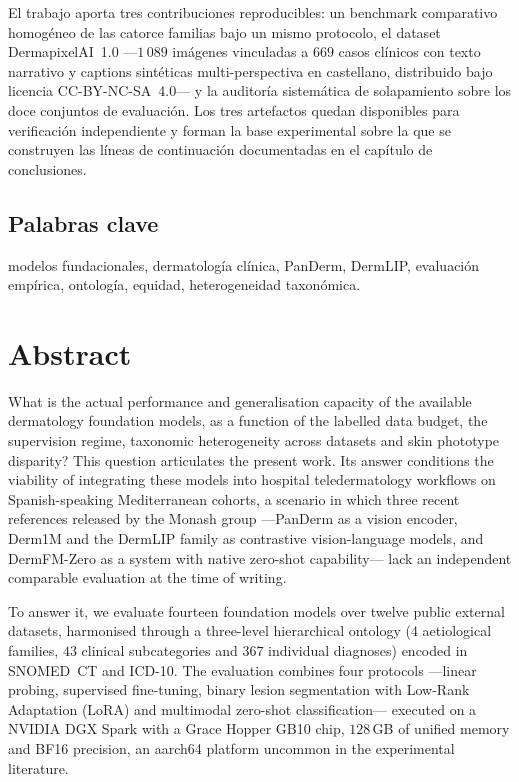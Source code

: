 El trabajo aporta tres contribuciones reproducibles: un benchmark
comparativo homogéneo de las catorce familias bajo un mismo
protocolo, el dataset DermapixelAI~1.0 ---$1\,089$ imágenes
vinculadas a $669$ casos clínicos con texto narrativo y captions
sintéticas multi-perspectiva en castellano, distribuido bajo
licencia CC-BY-NC-SA~4.0--- y la auditoría sistemática de
solapamiento sobre los doce conjuntos de evaluación. Los tres
artefactos quedan disponibles para verificación independiente y
forman la base experimental sobre la que se construyen las líneas
de continuación documentadas en el capítulo de conclusiones.

\section*{Palabras clave}
modelos fundacionales, dermatología clínica, PanDerm, DermLIP,
evaluación empírica, ontología, equidad, heterogeneidad taxonómica.


\chapter*{Abstract}

What is the actual performance and generalisation capacity of the
available dermatology foundation models, as a function of the
labelled data budget, the supervision regime, taxonomic
heterogeneity across datasets and skin phototype disparity? This
question articulates the present work. Its answer conditions the
viability of integrating these models into hospital teledermatology
workflows on Spanish-speaking Mediterranean cohorts, a scenario in
which three recent references released by the Monash group
---PanDerm as a vision encoder, Derm1M and the DermLIP family as
contrastive vision-language models, and DermFM-Zero as a system with
native zero-shot capability--- lack an independent comparable
evaluation at the time of writing.

To answer it, we evaluate fourteen foundation models over twelve
public external datasets, harmonised through a three-level
hierarchical ontology ($4$ aetiological families, $43$ clinical
subcategories and $367$ individual diagnoses) encoded in SNOMED~CT
and ICD-10. The evaluation combines four protocols ---linear
probing, supervised fine-tuning, binary lesion segmentation with
Low-Rank Adaptation (LoRA) and multimodal zero-shot
classification--- executed on a NVIDIA DGX Spark with a Grace
Hopper GB10 chip, $128$\,GB of unified memory and BF16 precision,
an aarch64 platform uncommon in the experimental literature.

